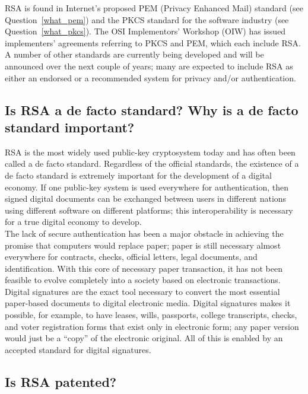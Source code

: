 RSA is found in Internet's proposed PEM (Privacy Enhanced Mail) standard
(see Question~\ref{what_pem}) and the PKCS standard for the software
industry (see Question~\ref{what_pkcs}). The OSI Implementors' Workshop
(OIW) has issued implementers' agreements referring to PKCS and PEM, which
each include RSA.\\

A number of other standards are currently being developed and will be
announced over the next couple of years; many are expected to include
RSA as either an endorsed or a recommended system for privacy and/or
authentication.

\subsection{Is RSA a de facto standard? Why is a de facto standard
important?}

RSA is the most widely used public-key cryptosystem today and has often
been called a de facto standard. Regardless of the official standards,
the existence of a de facto standard is extremely important for the
development of a digital economy. If one public-key system is used
everywhere for authentication, then signed digital documents can be
exchanged between users in different nations using different software
on different platforms; this interoperability is necessary for a true
digital economy to develop.\\

The lack of secure authentication has been a major obstacle in
achieving the promise that computers would replace paper; paper is
still necessary almost everywhere for contracts, checks, official
letters, legal documents, and identification. With this core of
necessary paper transaction, it has not been feasible to evolve
completely into a society based on electronic transactions. Digital
signatures are the exact tool necessary to convert the most essential
paper-based documents to digital electronic media. Digital signatures
makes it possible, for example, to have leases, wills, passports,
college transcripts, checks, and voter registration forms that exist
only in electronic form; any paper version would just be a ``copy'' of
the electronic original. All of this is enabled by an accepted standard
for digital signatures.

\subsection{Is RSA patented?}
\label{rsa_patent}

